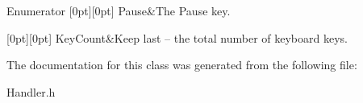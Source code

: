 \begin{DoxyEnumFields}{Enumerator}
[0pt][0pt]{}\hypertarget{class_key_handler_1_1_key_a832541e186986ff9f6bd5a810ed5c164adccd6e248893bb2436507d450f2f6e6d}{}\label{class_key_handler_1_1_key_a832541e186986ff9f6bd5a810ed5c164adccd6e248893bb2436507d450f2f6e6d} 
Pause&The Pause key. \\
\hline

[0pt][0pt]{}\hypertarget{class_key_handler_1_1_key_a832541e186986ff9f6bd5a810ed5c164a0aa780304087d38e44781c86fe30116a}{}\label{class_key_handler_1_1_key_a832541e186986ff9f6bd5a810ed5c164a0aa780304087d38e44781c86fe30116a} 
Key\+Count&Keep last -- the total number of keyboard keys. \\
\hline

\end{DoxyEnumFields}


The documentation for this class was generated from the following file\+:\begin{DoxyCompactItemize}
\item 
Handler.\+h\end{DoxyCompactItemize}
